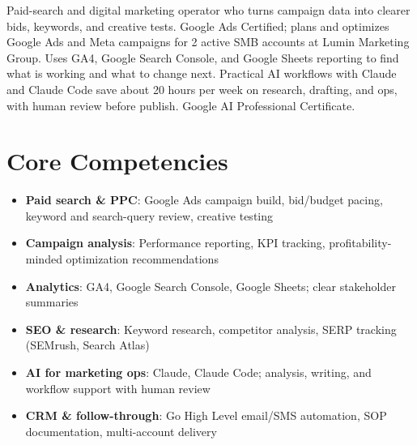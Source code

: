 \documentclass[11pt,a4paper,sans]{moderncv}
\begin{document}
\makecvtitle

\vspace{6pt}
\small{Paid-search and digital marketing operator who turns campaign data into clearer bids, keywords, and creative tests. Google Ads Certified; plans and optimizes Google Ads and Meta campaigns for 2 active SMB accounts at Lumin Marketing Group. Uses GA4, Google Search Console, and Google Sheets reporting to find what is working and what to change next. Practical AI workflows with Claude and Claude Code save about 20 hours per week on research, drafting, and ops, with human review before publish. Google AI Professional Certificate.}

\section{Core Competencies}
\vspace{1pt}
\begin{itemize}
\item \textbf{Paid search \& PPC}: Google Ads campaign build, bid/budget pacing, keyword and search-query review, creative testing
\item \textbf{Campaign analysis}: Performance reporting, KPI tracking, profitability-minded optimization recommendations
\item \textbf{Analytics}: GA4, Google Search Console, Google Sheets; clear stakeholder summaries
\item \textbf{SEO \& research}: Keyword research, competitor analysis, SERP tracking (SEMrush, Search Atlas)
\item \textbf{AI for marketing ops}: Claude, Claude Code; analysis, writing, and workflow support with human review
\item \textbf{CRM \& follow-through}: Go High Level email/SMS automation, SOP documentation, multi-account delivery
\end{itemize}
\end{document}

